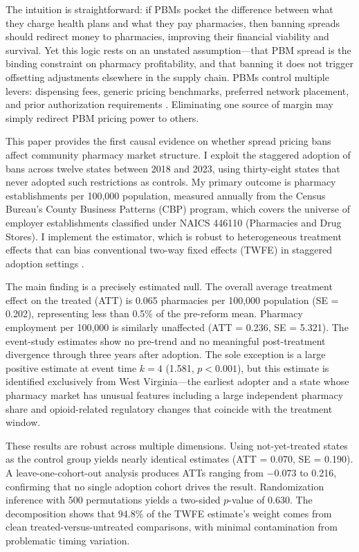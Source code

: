 \documentclass[12pt]{article}
\begin{document}
The intuition is straightforward: if PBMs pocket the difference between what they charge health plans and what they pay pharmacies, then banning spreads should redirect money to pharmacies, improving their financial viability and survival. Yet this logic rests on an unstated assumption---that PBM spread is the binding constraint on pharmacy profitability, and that banning it does not trigger offsetting adjustments elsewhere in the supply chain. PBMs control multiple levers: dispensing fees, generic pricing benchmarks, preferred network placement, and prior authorization requirements \citep{sood2017flow, vandervelde2018pbm}. Eliminating one source of margin may simply redirect PBM pricing power to others.

This paper provides the first causal evidence on whether spread pricing bans affect community pharmacy market structure. I exploit the staggered adoption of bans across twelve states between 2018 and 2023, using thirty-eight states that never adopted such restrictions as controls. My primary outcome is pharmacy establishments per 100,000 population, measured annually from the Census Bureau's County Business Patterns (CBP) program, which covers the universe of employer establishments classified under NAICS 446110 (Pharmacies and Drug Stores). I implement the \citet{callaway2021difference} estimator, which is robust to heterogeneous treatment effects that can bias conventional two-way fixed effects (TWFE) in staggered adoption settings \citep{goodman2021difference, sun2021estimating, dechaisemartin2020two}.

The main finding is a precisely estimated null. The overall average treatment effect on the treated (ATT) is 0.065 pharmacies per 100,000 population (SE = 0.202), representing less than 0.5\% of the pre-reform mean. Pharmacy employment per 100,000 is similarly unaffected (ATT = 0.236, SE = 5.321). The event-study estimates show no pre-trend and no meaningful post-treatment divergence through three years after adoption. The sole exception is a large positive estimate at event time $k = 4$ (1.581, $p < 0.001$), but this estimate is identified exclusively from West Virginia---the earliest adopter and a state whose pharmacy market has unusual features including a large independent pharmacy share and opioid-related regulatory changes that coincide with the treatment window.

These results are robust across multiple dimensions. Using not-yet-treated states as the control group yields nearly identical estimates (ATT = 0.070, SE = 0.190). A leave-one-cohort-out analysis produces ATTs ranging from $-0.073$ to 0.216, confirming that no single adoption cohort drives the result. Randomization inference with 500 permutations yields a two-sided $p$-value of 0.630. The \citet{goodman2021difference} decomposition shows that 94.8\% of the TWFE estimate's weight comes from clean treated-versus-untreated comparisons, with minimal contamination from problematic timing variation.
\end{document}
